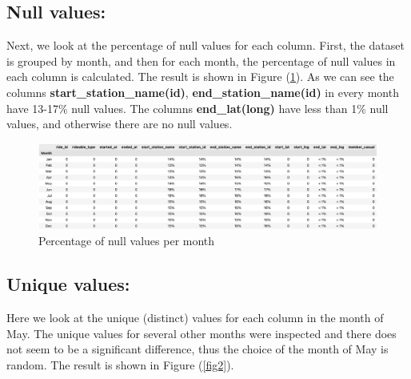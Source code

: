 \documentclass[12pt]{article}
\begin{document}
\subsection{Null values:}\label{sec1}
Next, we look at the percentage of null values for each column. First, the dataset is grouped by month, and then for each month, the percentage of null values in each column is calculated. The result is shown in Figure (\underline{\ref{fig4}}). As we can see the columns \textbf{start\_station\_name(id)}, \textbf{end\_station\_name(id)} in every month have 13-17\% null values. The columns \textbf{end\_lat(long)} have less than 1\% null values, and otherwise there are no null values. \\
	
	\begin{figure}[h]
	\centering
	\includegraphics[scale=0.44]{null_percents.png}
	\caption{Percentage of null values per month}
	\label{fig4}
	\end{figure}
	
\subsection{Unique values:}\label{sec2}
Here we look at the unique (distinct) values for each column in the month of May. The unique values for several other months were inspected and there does not seem to be a significant difference, thus the choice of the month of May is random. The result is shown in Figure (\underline{\ref{fig2}}). 
	
\end{document}
